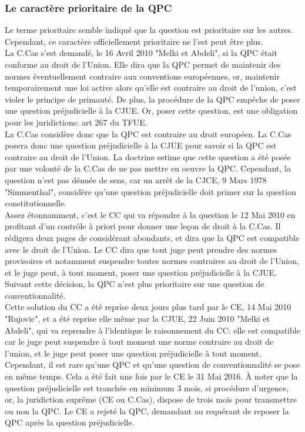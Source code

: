 \documentclass[10pt, a4paper, openany]{book}
\begin{document}
\subsubsection{Le caractère prioritaire de la QPC}

Le terme prioritaire semble indiqué que la question est prioritaire sur les autres. Cependant, ce caractère officiellement prioritaire ne l'est peut être plus. \\
La C.Cas s'est demandé, le 16 Avril 2010 "Melki et Abdeli", si la QPC était conforme au droit de l'Union. Elle dira que la QPC permet de maintenir des normes éventuellement contraire aux conventions européennes, or, maintenir temporairement une loi active alors qu'elle est contraire au droit de l'union, c'est violer le principe de primauté. De plus, la procédure de la QPC empêche de poser une question préjudicielle à la CJUE. Or, poser cette question, est une obligation pour les juridictions: art 267 du TFUE. \\
La C.Cas considère donc que la QPC est contraire au droit européen. La C.Cas posera donc une question préjudicielle à la CJUE pour savoir si la QPC est contraire au droit de l'Union. La doctrine estime que cette question a été posée par une volonté de la C.Cas de ne pas mettre en oeuvre la QPC. Cependant, la question n'est pas dénuée de sens, car un arrêt de la CJCE, 9 Mars 1978 "Simmenthal", considère qu'une question préjudicielle doit primer sur la question constitutionnelle. \\
Assez étonnamment, c'est le CC qui va répondre à la question le 12 Mai 2010 en profitant d'un contrôle à priori pour donner une leçon de droit à la C.Cas. Il rédigera deux pages de considérant abondants, et dira que la QPC est compatible avec le droit de l'Union. Le CC dira que tout juge peut prendre des normes provisoires et notamment suspendre toutes normes contraires au droit de l'Union, et le juge peut, à tout moment, poser une question préjudicielle à la CJUE. Suivant cette décision, la QPC n'est plus prioritaire sur une question de conventionnalité. \\
Cette solution du CC a été reprise deux jours plus tard par le CE, 14 Mai 2010 "Rujovic", et a été reprise elle même par la CJUE, 22 Juin 2010 "Melki et Abdeli", qui va reprendre à l'identique le raisonnement du CC: elle est compatible car le juge peut suspendre à tout moment une norme contraire au droit de l'union, et le juge peut poser une question préjudicielle à tout moment. \\
Cependant, il est rare qu'une QPC et qu'une question de conventionnalité se pose en même temps. Cela a été fait une fois par le CE le 31 Mai 2016. À noter que la question préjudicielle est tranchée en minimum 3 mois, si procédure d'urgence, or, la juridiction suprême (CE ou C.Cas), dispose de trois mois pour transmettre ou non la QPC. Le CE a rejeté la QPC, demandant au requérant de reposer la QPC après la question préjudicielle. 
\end{document}
